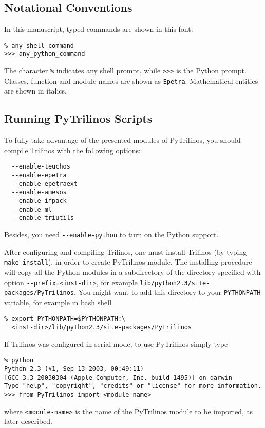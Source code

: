 \documentclass[10pt,relax]{SANDreport}
\newcommand{\PyTrilinos}{{PyTrilinos}}
\begin{document}
\subsection{Notational Conventions}
\label{sec:notational}

In this manuscript, typed commands are shown in this font:
\begin{verbatim}
% any_shell_command
>>> any_python_command
\end{verbatim}
The character \verb!%! indicates any shell prompt, while \verb!>>>! is the
Python prompt. Classes, function and module names are shown as \verb!Epetra!.
Mathematical entities are shown in italics.

\subsection{Running PyTrilinos Scripts}
\label{sec:running}

To fully take advantage of the presented modules of \PyTrilinos, you should
compile Trilinos with the following options:
\begin{verbatim}
  --enable-teuchos    
  --enable-epetra     
  --enable-epetraext  
  --enable-amesos    
  --enable-ifpack     
  --enable-ml         
  --enable-triutils   
\end{verbatim}
Besides, you need \verb!--enable-python! to turn on the Python support. 

After configuring and compiling Trilinos, one must install Trilinos 
(by typing \verb!make install!), in order to create PyTrilinos module.
The installing procedure will copy all the Python modules in a subdirectory of
the directory specified with option \verb!--prefix=<inst-dir>!, for example
\verb!lib/python2.3/site-packages/PyTrilinos!. You might want to add this
directory to your \verb!PYTHONPATH! variable, for example in bash shell
\begin{verbatim}
% export PYTHONPATH=$PYTHONPATH:\
  <inst-dir>/lib/python2.3/site-packages/PyTrilinos
\end{verbatim}

If Trilinos was configured in serial mode, to use PyTrilinos  simply type
\begin{verbatim}
% python
Python 2.3 (#1, Sep 13 2003, 00:49:11) 
[GCC 3.3 20030304 (Apple Computer, Inc. build 1495)] on darwin
Type "help", "copyright", "credits" or "license" for more information.
>>> from PyTrilinos import <module-name>
\end{verbatim}
where \verb!<module-name>! is the name of the PyTrilinos module to be
imported, as later described.
\end{document}
